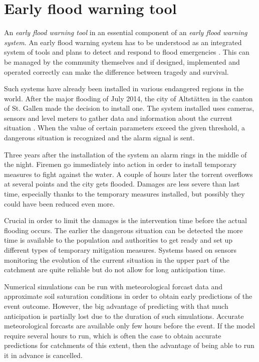 \chapter{Early flood warning tool}
\label{chp:flood_warning_system}

An \textit{early flood warning tool} in an essential component of an \textit{early flood warning system}.
An early flood warning system has to be understood as an integrated system of tools and plans to detect and respond to flood emergencies \autocite{icimod_early_2018}.
This can be managed by the community themselves and if designed, implemented and operated correctly can make the difference between tragedy and survival.

Such systems have already been installed in various endangered regions in the world.
After the major flooding of July 2014, the city of Altstätten in the canton of St. Gallen made the decision to install one.
The system installed uses cameras, sensors and level meters to gather data and information about the current situation \autocite{st._galler_tageblatt_altstatten_2017}.
When the value of certain parameters exceed the given threshold, a dangerous situation is recognized and the alarm signal is sent.

Three years after the installation of the system an alarm rings in the middle of the night.
Firemen go immediately into action in order to install temporary measures to fight against the water.
A couple of hours later the torrent overflows at several points and the city gets flooded.
Damages are less severe than last time, especially thanks to the temporary measures installed, but possibly they could have been reduced even more.

Crucial in order to limit the damages is the intervention time before the actual flooding occurs.
The earlier the dangerous situation can be detected the more time is available to the population and authorities to get ready and set up different types of temporary mitigation measures.
Systems based on sensors monitoring the evolution of the current situation in the upper part of the catchment are quite reliable but do not allow for long anticipation time. 

Numerical simulations can be run with meteorological forcast data and approximate soil saturation conditions in order to obtain early predictions of the event outcome.
However, the big advantage of predicting with that much anticipation is partially lost due to the duration of such simulations.
Accurate meteorological forcasts are available only few hours before the event.
If the model require several hours to run, which is often the case to obtain accurate predictions for catchments of this extent, then the advantage of being able to run it in advance is cancelled.

